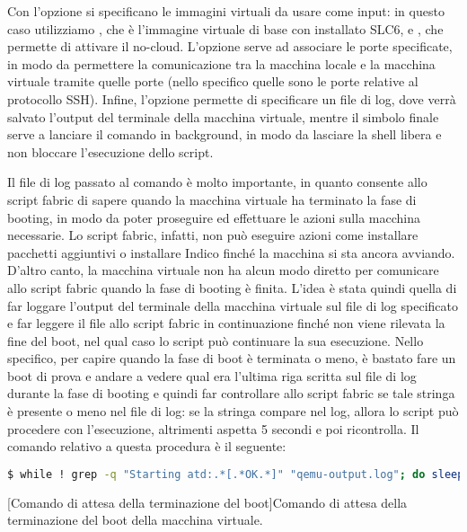             Con l'opzione  si specificano le immagini virtuali da usare come input: in questo caso utilizziamo , che è l'immagine virtuale di base con installato \ac{SLC6}, e , che permette di attivare il no-cloud. L'opzione  serve ad associare le porte specificate, in modo da permettere la comunicazione tra la macchina locale e la macchina virtuale tramite quelle porte (nello specifico quelle sono le porte relative al protocollo \ac{SSH}). Infine, l'opzione  permette di specificare un file di log, dove verrà salvato l'output del terminale della macchina virtuale, mentre il simbolo \bash{&} finale serve a lanciare il comando in background, in modo da lasciare la shell libera e non bloccare l'esecuzione dello script.
            
            Il file di log passato al comando  è molto importante, in quanto consente allo script fabric di sapere quando la macchina virtuale ha terminato la fase di booting, in modo da poter proseguire ed effettuare le azioni sulla macchina necessarie. Lo script fabric, infatti, non può eseguire azioni come installare pacchetti aggiuntivi o installare Indico finché la macchina si sta ancora avviando. D'altro canto, la macchina virtuale non ha alcun modo diretto per comunicare allo script fabric quando la fase di booting è finita. L'idea è stata quindi quella di far loggare l'output del terminale della macchina virtuale sul file di log specificato e far leggere il file allo script fabric in continuazione finché non viene rilevata la fine del boot, nel qual caso lo script può continuare la sua esecuzione. Nello specifico, per capire quando la fase di boot è terminata o meno, è bastato fare un boot di prova e andare a vedere qual era l'ultima riga scritta sul file di log durante la fase di booting e quindi far controllare allo script fabric se tale stringa è presente o meno nel file di log: se la stringa compare nel log, allora lo script può procedere con l'esecuzione, altrimenti aspetta 5 secondi e poi ricontrolla. Il comando relativo a questa procedura è il seguente:
            
            \begin{center}
                \begin{minipage}{\linewidth}
                    \begin{lstlisting}[language=bash, gobble=22]
                        $ while ! grep -q "Starting atd:.*[.*OK.*]" "qemu-output.log"; do sleep 5; done
                    \end{lstlisting}
                    \captionsetup{textformat=empty,labelformat=empty} \vspace{-2em}
                    [Comando di attesa della terminazione del boot]{Comando di attesa della terminazione del boot della macchina virtuale.}
                \end{minipage}
            \end{center}
            

